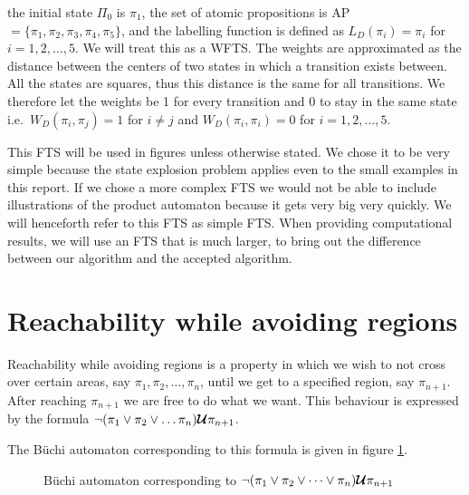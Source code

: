 the initial state $\Pi_0$ is $\pi_1$, the set of atomic propositions is AP$=\{\pi_1,\pi_2,\pi_3,\pi_4,\pi_5\}$, and the labelling function is defined as $L_D(\pi_i) = \pi_i$ for $i=1,2,\dots,5$. We will treat this as a WFTS. The weights are approximated as the distance between the centers of two states in which a transition exists between. All the states are squares, thus this distance is the same for all transitions. We therefore let the weights be 1 for every transition and 0 to stay in the same state i.e.\ $W_D(\pi_i, \pi_j) = 1$ for $i \neq j$ and $W_D(\pi_i,\pi_i)=0$ for $i=1,2,\dots,5$.

This FTS will be used in figures unless otherwise stated. We chose it to be very simple because the state explosion problem applies even to the small examples in this report. If we chose a more complex FTS we would not be able to include illustrations of the product automaton because it gets very big very quickly. We will henceforth refer to this FTS as simple FTS. When providing computational results, we will use an FTS that is much larger, to bring out the difference between our algorithm and the accepted algorithm.


\section{Reachability while avoiding regions} 
Reachability while avoiding regions is a property in which we wish to not cross over certain areas, say $\pi_1, \pi_2, \dots, \pi_n$, until we get to a specified region, say $\pi_{n+1}$. After reaching $\pi_{n+1}$ we are free to do what we want. This behaviour is expressed by the formula $\neg (\pi_1 \lor \pi_2 \lor \dots \pi_n) \bm{\mathcal{U}} \pi_{n+1}$. 

The B\"{u}chi automaton corresponding to this formula is given in figure \ref{fig:ReachAvoid}.

\begin{figure}
\centering
{}
\caption{B\"{u}chi automaton corresponding to $\neg (\pi_1 \lor \pi_2 \lor \dots \lor \pi_n) \bm{\mathcal{U}} \pi_{n+1}$}
\label{fig:ReachAvoid}
\end{figure}

